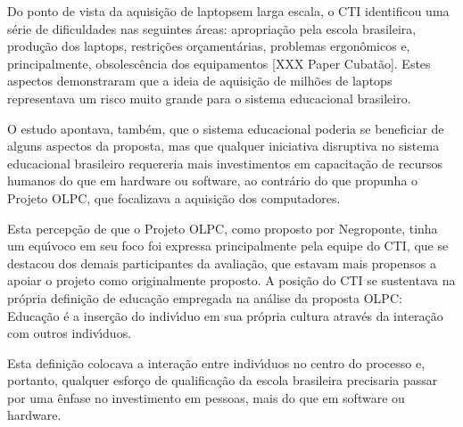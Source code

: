 \documentclass[
12pt,		%
openright,	%
twoside,  %
a4paper,			%
chapter=TITLE,		%
english,			%
french,				%
spanish,			%
brazil				%
]{USPSC-classe/USPSC}
\begin{document}
Do ponto de vista da aquisi\c{c}\~ao de \textquotedbl laptops\textquotedbl  em larga escala, o CTI identificou uma s\'erie de dificuldades nas seguintes \'areas: apropria\c{c}\~ao pela escola brasileira, produ\c{c}\~ao dos laptops, restri\c{c}\~oes or\c{c}ament\'arias, problemas ergon\^omicos e, principalmente, obsolesc\^encia dos equipamentos [XXX Paper Cubat\~ao]. Estes aspectos demonstraram que a ideia de aquisi\c{c}\~ao de milh\~oes de laptops representava um risco muito grande para o sistema educacional brasileiro.










O estudo apontava, tamb\'em, que o sistema educacional poderia se beneficiar de alguns aspectos da proposta, mas que qualquer iniciativa disruptiva no sistema educacional brasileiro requereria mais investimentos em capacita\c{c}\~ao de recursos humanos do que em hardware ou software, ao contr\'ario do que propunha o Projeto OLPC, que focalizava a aquisi\c{c}\~ao dos computadores.










Esta percep\c{c}\~ao de que o Projeto OLPC, como proposto por Negroponte, tinha um equ\'{\i}voco em seu foco foi expressa principalmente pela equipe do CTI, que se destacou dos demais participantes da avalia\c{c}\~ao, que estavam mais propensos a apoiar o projeto como originalmente proposto. A posi\c{c}\~ao do CTI se sustentava na pr\'opria defini\c{c}\~ao de educa\c{c}\~ao empregada na an\'alise da proposta OLPC: \textquotedbl Educa\c{c}\~ao \'e a inser\c{c}\~ao do indiv\'{\i}duo em sua pr\'opria cultura atrav\'es da intera\c{c}\~ao com outros indiv\'{\i}duos.










Esta defini\c{c}\~ao colocava a intera\c{c}\~ao entre indiv\'{\i}duos no centro do processo e, portanto, qualquer esfor\c{c}o de qualifica\c{c}\~ao da escola brasileira precisaria passar por uma \^enfase no investimento em \textquotedbl pessoas, mais do que em software ou hardware\textquotedbl .
\end{document}
